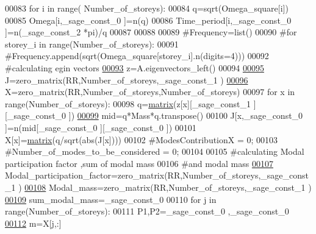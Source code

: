 \begin{DoxyCode}
00083 \textcolor{keywordflow}{for} i \textcolor{keywordflow}{in} range( Number\_of\_storeys):
00084     q=sqrt(Omega\_square[i])
00085     Omega[i,\_sage\_const\_0 ]=n(q)
00086     Time\_period[i,\_sage\_const\_0 ]=n(\_sage\_const\_2 *pi)/q
00087 
00088 
00089 \textcolor{comment}{#Frequency=list()}
00090 \textcolor{comment}{#for storey\_i in range(Number\_of\_storeys):}
00091     \textcolor{comment}{#Frequency.append(sqrt(Omega\_square[storey\_i].n(digits=4)))}
00092 \textcolor{comment}{#calculating egin vectors}
\hypertarget{main_8sage_8py_source_l00093}{}\hyperlink{namespacemain_a2d5b336e3b2f7d2e14f04fa3cc413457}{00093} z=A.eigenvectors\_left()
00094 
\hypertarget{main_8sage_8py_source_l00095}{}\hyperlink{namespacemain_a00488f5887e168f7781b6fb94dd08518}{00095} J=zero\_matrix(RR,Number\_of\_storeys,\_sage\_const\_1 )
\hypertarget{main_8sage_8py_source_l00096}{}\hyperlink{namespacemain_a5eac8e4368036ef94463d6e42c1628c5}{00096} X=zero\_matrix(RR,Number\_of\_storeys,Number\_of\_storeys)
00097 \textcolor{keywordflow}{for} x \textcolor{keywordflow}{in} range(Number\_of\_storeys):
00098     q=\hyperlink{namespacecivilsage_1_1views_a8b58c93a9c82e84143c43dafaa744a4b}{matrix}(z[x][\_sage\_const\_1 ][\_sage\_const\_0 ])
\hypertarget{main_8sage_8py_source_l00099}{}\hyperlink{namespacemain_a70551c7fc78da8fdec83fe500056d388}{00099}     mid=q*Mass*q.transpose()
00100     J[x,\_sage\_const\_0 ]=n(mid[\_sage\_const\_0 ][\_sage\_const\_0 ])
00101     X[x]=\hyperlink{namespacecivilsage_1_1views_a8b58c93a9c82e84143c43dafaa744a4b}{matrix}(q/sqrt(abs(J[x])))
00102 \textcolor{comment}{#ModesContributionX = 0;}
00103 \textcolor{comment}{#Number\_of\_modes\_to\_be\_considered = 0;}
00104 
00105 \textcolor{comment}{#calculating Modal participation factor ,sum of modal mass}
00106 \textcolor{comment}{#and modal mass}
\hypertarget{main_8sage_8py_source_l00107}{}\hyperlink{namespacemain_a936ce857e8e4f4855af1cc5bf2635191}{00107} Modal\_participation\_factor=zero\_matrix(RR,Number\_of\_storeys,\_sage\_const\_1 )
\hypertarget{main_8sage_8py_source_l00108}{}\hyperlink{namespacemain_a176940b2d446033050ac092436f63974}{00108} Modal\_mass=zero\_matrix(RR,Number\_of\_storeys,\_sage\_const\_1 )
\hypertarget{main_8sage_8py_source_l00109}{}\hyperlink{namespacemain_a27fb93072b84fd448623807df350f132}{00109} sum\_modal\_mass=\_sage\_const\_0 
00110 \textcolor{keywordflow}{for} j \textcolor{keywordflow}{in} range(Number\_of\_storeys):
00111         P1,P2=\_sage\_const\_0 ,\_sage\_const\_0 
\hypertarget{main_8sage_8py_source_l00112}{}\hyperlink{namespacemain_af6e3698b7f50fc004eb759d7c447fdb3}{00112}         m=X[j,:]

\end{DoxyCode}
